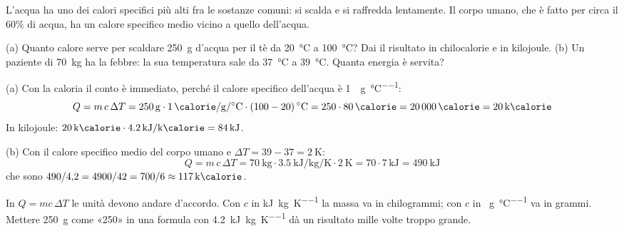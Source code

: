 L'acqua ha uno dei calori specifici più alti fra le sostanze comuni: si scalda e si raffredda lentamente. Il corpo umano, che è fatto per circa il 60\% di acqua, ha un calore specifico medio vicino a quello dell'acqua.

\begin{esempio}
(a) Quanto calore serve per scaldare \SI{250}{\gram} d'acqua per il tè da \SI{20}{\celsius} a \SI{100}{\celsius}? Dai il risultato in chilocalorie e in kilojoule. (b) Un paziente di \SI{70}{\kilo\gram} ha la febbre: la sua temperatura sale da \SI{37}{\celsius} a \SI{39}{\celsius}. Quanta energia è servita?

(a) Con la caloria il conto è immediato, perché il calore specifico dell'acqua è \SI{1}{\calorie\per\gram\per\celsius}:
\[
  Q = m\,c\,\Delta T = \SI{250}{\gram} \cdot \SI{1}{\calorie\per\gram\per\celsius} \cdot (100 - 20)\,\si{\celsius} = 250 \cdot 80\,\si{\calorie} = \SI{20000}{\calorie} = \SI{20}{\kilo\calorie}
\]
In kilojoule: $\SI{20}{\kilo\calorie} \cdot \SI{4,2}{\kilo\joule\per\kilo\calorie} = \SI{84}{\kilo\joule}$.

(b) Con il calore specifico medio del corpo umano e $\Delta T = 39 - 37 = \SI{2}{\kelvin}$:
\[
  Q = m\,c\,\Delta T = \SI{70}{\kilo\gram} \cdot \SI{3,5}{\kilo\joule\per\kilo\gram\per\kelvin} \cdot \SI{2}{\kelvin} = 70 \cdot 7\,\si{\kilo\joule} = \SI{490}{\kilo\joule}
\]
che sono $490/4{,}2 = 4900/42 = 700/6 \approx \SI{117}{\kilo\calorie}$.
\end{esempio}

\begin{attenzione}
In $Q = mc\,\Delta T$ le unità devono andare d'accordo. Con $c$ in \si{\kilo\joule\per\kilo\gram\per\kelvin} la massa va in chilogrammi; con $c$ in \si{\calorie\per\gram\per\celsius} va in grammi. Mettere \SI{250}{\gram} come «250» in una formula con \SI{4,2}{\kilo\joule\per\kilo\gram\per\kelvin} dà un risultato mille volte troppo grande.
\end{attenzione}



